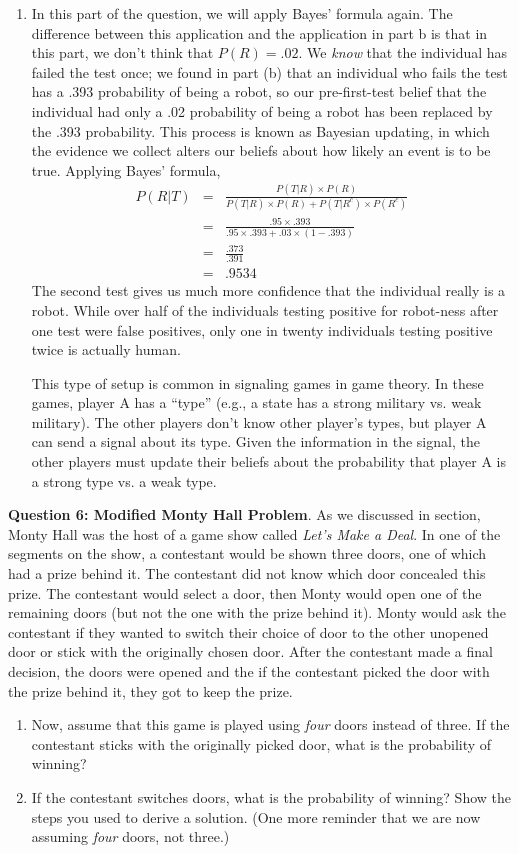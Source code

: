 \documentclass[10pt]{amsart}
\begin{document}
\begin{enumerate}
\medskip
\item
In this part of the question, we will apply Bayes' formula again. The difference between this application and the application in part b is that in this part, we don't think that $P(R) = .02$. We \textit{know} that the individual has failed the test once; we found in part (b) that an individual who fails the test has a .393 probability of being a robot, so our pre-first-test belief that the individual had only a .02 probability of being a robot has been replaced by the .393 probability. This process is known as Bayesian updating, in which the evidence we collect alters our beliefs about how likely an event is to be true.
Applying Bayes' formula,
\begin{eqnarray*}
P(R|T) &=& \frac{P(T|R) \times P(R)}{P(T|R) \times P(R) + P(T|R^c) \times P(R^c)} \\
&=& \frac{.95 \times .393}{.95 \times .393 +.03 \times (1-.393)} \\
&=& \frac{.373}{.391} \\
&=& .9534
\end{eqnarray*}
The second test gives us much more confidence that the individual really is a robot. While over half of the individuals testing positive for robot-ness after one test were false positives, only one in twenty individuals testing positive twice is actually human. 

This type of setup is common in signaling games in game theory. In these games, player A has a ``type'' (e.g., a state has a strong military vs. weak military). The other players don't know other player's types, but player A can send a signal about its type. Given the information in the signal, the other players must update their beliefs about the probability that player A is a strong type vs. a weak type. 
\end{enumerate}

\noindent \textbf{Question 6: Modified Monty Hall Problem}. As we discussed in section, Monty Hall was the host of a game show called \textit{Let's Make a Deal}. In one of the segments on the show, a contestant would be shown three doors, one of which had a prize behind it. The contestant did not know which door concealed this prize. The contestant would select a door, then Monty would open one of the remaining doors (but not the one with the prize behind it). Monty would ask the contestant if they wanted to switch their choice of door to the other unopened door or stick with the originally chosen door. After the contestant made a final decision, the doors were opened and the if the contestant picked the door with the prize behind it, they got to keep the prize.
\begin{enumerate}
\item Now, assume that this game is played using {\it four} doors instead of three. If the contestant sticks with the originally picked door, what is the probability of winning?
\item If the contestant switches doors, what is the probability of winning? Show the steps you used to derive a solution. (One more reminder that we are now assuming {\it four} doors, not three.)
\end{enumerate}
\end{document}
